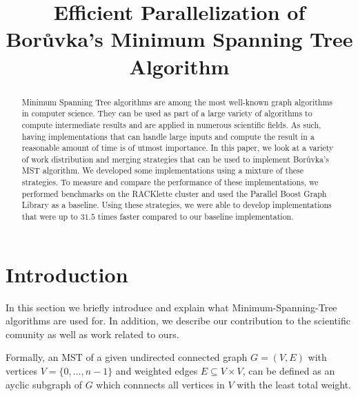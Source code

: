 \documentclass[letterpaper]{article}
\title{Efficient Parallelization of Bor\r{u}vka's \linebreak Minimum Spanning Tree Algorithm}
\begin{document}
\maketitle

\begin{abstract}
Minimum Spanning Tree algorithms are among the most well-known graph algorithms in computer science. They can be used as
part of a large variety of algorithms to compute intermediate results and are applied in numerous scientific fields. As
such, having implementations that can handle large inputs and compute the result in a reasonable amount of time is of
utmost importance. In this paper, we look at a variety of work distribution and merging strategies that can be used to
implement Bor\r{u}vka's MST algorithm. We developed some implementations using a mixture of these strategies. To measure
and compare the performance of these implementations, we performed benchmarks on the RACKlette cluster and used the
Parallel Boost Graph Library as a baseline. Using these strategies, we were able to develop implementations that were up
to $31.5$ times faster compared to our baseline implementation.
\end{abstract}

\section{Introduction}
\label{sec:intro}
In this section we briefly introduce and explain what Minimum-Spanning-Tree algorithms are used for. In addition, we
describe our contribution to the scientific comunity as well as work related to ours.

Formally, an MST of a given undirected connected graph $G = (V, E)$ with vertices $V = \{ 0, \dotsc, n - 1 \}$ and
weighted edges $E \subseteq V \times V$, can be defined as an ayclic subgraph of $G$ which connnects all vertices in
$V$ with the least total weight.
\end{document}
